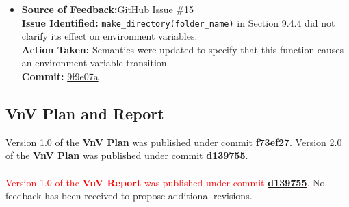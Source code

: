 \documentclass{article}
\begin{document}
\begin{itemize}
  \item \textbf{Source of Feedback:}\href{https://github.com/KiranSingh15/CAS-741-Image-Correspondences/issues/15}{GitHub Issue \#15} \\
  \textbf{Issue Identified:} \texttt{make\_directory(folder\_name)} in Section 9.4.4 did not clarify its effect on environment variables. \\
  \textbf{Action Taken:} Semantics were updated to specify that this function causes an environment variable transition. \\
  \textbf{Commit:} \href{https://github.com/KiranSingh15/CAS-741-Image-Correspondences/commit/9f9e07a572e2f0db97f3e057f998ba9bad0d9189}{9f9e07a}

\end{itemize}



\subsection{VnV Plan and Report}
\noindent Version 1.0 of the \textbf{VnV Plan} was published under commit \href{https://github.com/KiranSingh15/CAS-741-Image-Correspondences/commit/f73ef273ec0e440c47bb849f142982482d895bc0}{\textbf{f73ef27}}. Version 2.0 of the \textbf{VnV Plan} was published under commit \href{https://github.com/KiranSingh15/CAS-741-Image-Correspondences/commit/d139755d96b3c7b316cd7f96106ef69df3ab228a}{\textbf{d139755}}.\\ \\

\noindent \textcolor{red}{Version 1.0 of the \textbf{VnV Report} was published under commit \href{https://github.com/KiranSingh15/CAS-741-Image-Correspondences/commit/d139755d96b3c7b316cd7f96106ef69df3ab228a}{\textbf{d139755}}.} No feedback has been received to propose additional revisions.
\end{document}

